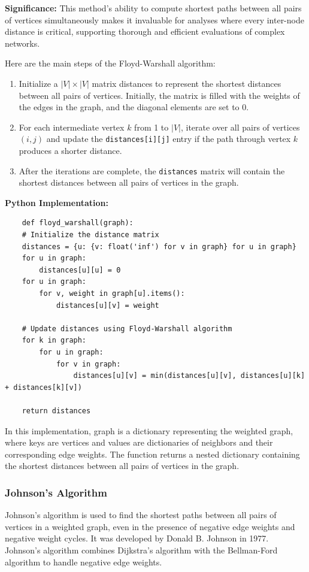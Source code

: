\documentclass[12pt]{book} %
\begin{document}
\textbf{Significance:}
This method’s ability to compute shortest paths between all pairs of vertices simultaneously makes it invaluable for analyses where every inter-node distance is critical, supporting thorough and efficient evaluations of complex networks.


Here are the main steps of the Floyd-Warshall algorithm:

\begin{enumerate}
    \item Initialize a $|V| \times |V|$ matrix distances to represent the shortest distances between all pairs of vertices. Initially, the matrix is filled with the weights of the edges in the graph, and the diagonal elements are set to 0.
    \item For each intermediate vertex $k$ from 1 to $|V|$, iterate over all pairs of vertices $(i, j)$ and update the \texttt{distances[i][j]} entry if the path through vertex $k$ produces a shorter distance.
    \item After the iterations are complete, the \texttt{distances} matrix will contain the shortest distances between all pairs of vertices in the graph.
\end{enumerate}

\textbf{Python Implementation:}
\FloatBarrier
\begin{lstlisting}
    def floyd_warshall(graph):
    # Initialize the distance matrix
    distances = {u: {v: float('inf') for v in graph} for u in graph}
    for u in graph:
        distances[u][u] = 0
    for u in graph:
        for v, weight in graph[u].items():
            distances[u][v] = weight
    
    # Update distances using Floyd-Warshall algorithm
    for k in graph:
        for u in graph:
            for v in graph:
                distances[u][v] = min(distances[u][v], distances[u][k] + distances[k][v])
    
    return distances
\end{lstlisting}
In this implementation, graph is a dictionary representing the weighted graph, where keys are vertices and values are dictionaries of neighbors and their corresponding edge weights. The function returns a nested dictionary containing the shortest distances between all pairs of vertices in the graph.

\subsubsection{Johnson's Algorithm}
Johnson's algorithm is used to find the shortest paths between all pairs of vertices in a weighted graph, even in the presence of negative edge weights and negative weight cycles. It was developed by Donald B. Johnson in 1977. Johnson's algorithm combines Dijkstra's algorithm with the Bellman-Ford algorithm to handle negative edge weights.
\end{document}
